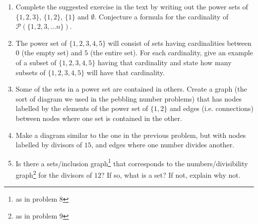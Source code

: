 \documentclass{amsart}
\begin{document}
\begin{enumerate}
\vfill

\item Complete the suggested exercise in the text by writing out the power sets of $\{1,2,3\}$, $\{1,2\}$, $\{1\}$ and $\emptyset$.  Conjecture a formula for the cardinality of ${\mathcal P}(\{1,2,3,\ldots n\})$.

\vfill

\newpage

\item The power set of $\{1, 2, 3, 4, 5\}$ will consist of sets having cardinalities between $0$ (the empty set) and $5$ (the entire set).  For each cardinality, give an example of a subset of $\{1, 2, 3, 4, 5\}$ having that cardinality and state how many subsets of $\{1, 2, 3, 4, 5\}$ will have that cardinality.

\vfill

\item Some of the sets in a power set are contained in others.  Create a graph (the sort of diagram we used in the pebbling number problems) that has nodes labelled by the elements of the power set of $\{1,2\}$ and edges (i.e. connections) between nodes where one set is contained in the other.

\vfill

\newpage

\item Make a diagram similar to the one in the previous problem, but with nodes labelled by divisors of $15$, and edges where one number divides another. 

\vfill

\item Is there a sets/inclusion graph\footnote{as in problem 8}  that corresponds to the numbers/divisibility graph\footnote{as in problem 9} for the divisors of $12$?  If so, what is a set?  If not, explain why not.

\vfill

\end{enumerate}
\end{document}
